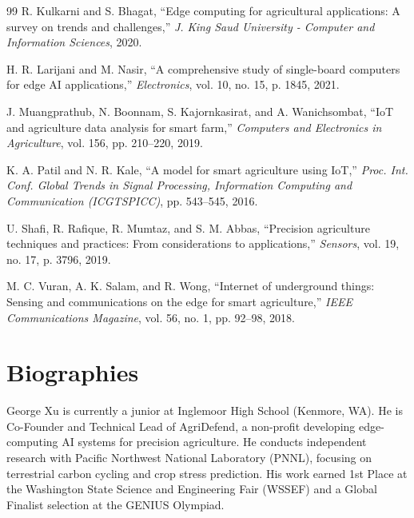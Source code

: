 \documentclass[10pt,twocolumn]{article}
\begin{document}
\begin{thebibliography}{99}
 R. Kulkarni and S. Bhagat, ``Edge computing for agricultural applications: A survey on trends and challenges,'' \textit{J. King Saud University - Computer and Information Sciences}, 2020.

 H. R. Larijani and M. Nasir, ``A comprehensive study of single-board computers for edge AI applications,'' \textit{Electronics}, vol. 10, no. 15, p. 1845, 2021.

 J. Muangprathub, N. Boonnam, S. Kajornkasirat, and A. Wanichsombat, ``IoT and agriculture data analysis for smart farm,'' \textit{Computers and Electronics in Agriculture}, vol. 156, pp. 210--220, 2019.

 K. A. Patil and N. R. Kale, ``A model for smart agriculture using IoT,'' \textit{Proc. Int. Conf. Global Trends in Signal Processing, Information Computing and Communication (ICGTSPICC)}, pp. 543--545, 2016.

 U. Shafi, R. Rafique, R. Mumtaz, and S. M. Abbas, ``Precision agriculture techniques and practices: From considerations to applications,'' \textit{Sensors}, vol. 19, no. 17, p. 3796, 2019.

 M. C. Vuran, A. K. Salam, and R. Wong, ``Internet of underground things: Sensing and communications on the edge for smart agriculture,'' \textit{IEEE Communications Magazine}, vol. 56, no. 1, pp. 92--98, 2018.

\end{thebibliography}

\section*{Biographies}

\begin{IEEEbiographynophoto}{George Xu}
is currently a junior at Inglemoor High School (Kenmore, WA). He is Co-Founder and Technical Lead of AgriDefend, a non-profit developing edge-computing AI systems for precision agriculture. He conducts independent research with Pacific Northwest National Laboratory (PNNL), focusing on terrestrial carbon cycling and crop stress prediction. His work earned 1st Place at the Washington State Science and Engineering Fair (WSSEF) and a Global Finalist selection at the GENIUS Olympiad.
\end{IEEEbiographynophoto}
\end{document}

